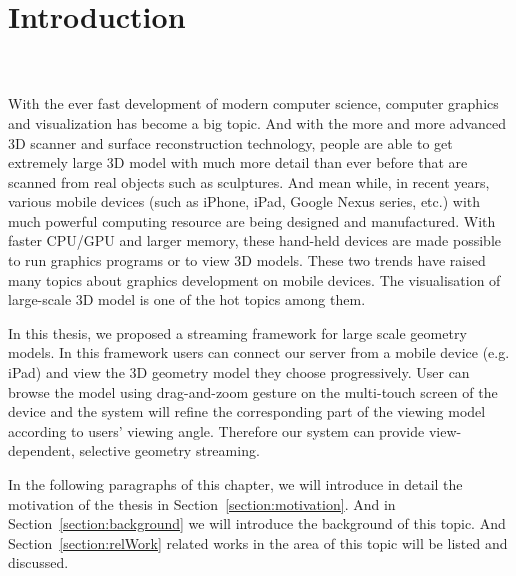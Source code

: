 \chapter{Introduction}
\label{chapter:introduction}
\\
\\

With the ever fast development of modern computer science, computer graphics and visualization has become a big topic. And with the more and more advanced 3D scanner and surface reconstruction technology, people are able to get extremely large 3D model with much more detail than ever before that are scanned from real objects such as sculptures. 
And mean while, in recent years, various mobile devices (such as iPhone, iPad, Google Nexus series, etc.) with much powerful computing resource are being designed and manufactured. With faster CPU/GPU and larger memory, these hand-held devices are made possible to run graphics programs or to view 3D models. These two trends have raised many topics about graphics development on mobile devices. The visualisation of large-scale 3D model is one of the hot topics among them. 

\smallskip

In this thesis, we proposed a streaming framework for large scale geometry models. In this framework users can connect our server from a mobile device (e.g. iPad) and view the 3D geometry model they choose progressively. User can browse the model using drag-and-zoom gesture on the multi-touch screen of the device and the system will refine the corresponding part of the viewing model according to users' viewing angle. Therefore our system can provide view-dependent, selective geometry streaming. 

\smallskip
In the following paragraphs of this chapter, we will introduce in detail the motivation of the thesis in Section~\ref{section:motivation}. And in Section~\ref{section:background} we will introduce the background of this topic. And Section~\ref{section:relWork} related works in the area of this topic will be listed and discussed. 

